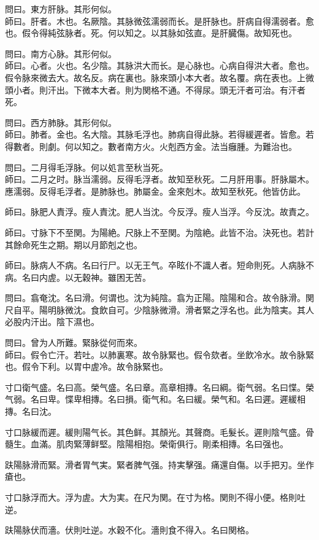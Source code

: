 \documentclass[12pt,twoside,UTF8,b5paper]{ctexbook}
\begin{document}
問曰。東方肝脉。其形何似。\\
師曰。肝者。木也。名厥陰。其脉微弦濡弱而长。是肝脉也。肝病自得濡弱者。愈也。假令得純弦脉者。死。何以知之。以其脉如弦直。是肝臓傷。故知死也。

問曰。南方心脉。其形何似。\\
師曰。心者。火也。名少陰。其脉洪大而长。是心脉也。心病自得洪大者。愈也。假令脉來微去大。故名反。病在裏也。脉來頭小本大者。故名覆。病在表也。上微頭小者。則汗出。下微本大者。則为関格不通。不得尿。頭无汗者可治。有汗者死。

問曰。西方肺脉。其形何似。\\
師曰。肺者。金也。名大陰。其脉毛浮也。肺病自得此脉。若得緩遲者。皆愈。若得數者。則劇。何以知之。數者南方火。火剋西方金。法当癰腫。为難治也。

問曰。二月得毛浮脉。何以処言至秋当死。\\
師曰。二月之时。脉当濡弱。反得毛浮者。故知至秋死。二月肝用事。肝脉屬木。應濡弱。反得毛浮者。是肺脉也。肺屬金。金來剋木。故知至秋死。他皆仿此。

師曰。脉肥人責浮。瘦人責沈。肥人当沈。今反浮。瘦人当浮。今反沈。故責之。

師曰。寸脉下不至関。为陽絶。尺脉上不至関。为陰絶。此皆不治。決死也。若計其餘命死生之期。期以月節剋之也。

師曰。脉病人不病。名曰行尸。以无王气。卒眩仆不識人者。短命則死。人病脉不病。名曰内虗。以无穀神。雖困无苦。

問曰。翕奄沈。名曰滑。何谓也。沈为純陰。翕为正陽。陰陽和合。故令脉滑。関尺自平。陽明脉微沈。食飲自可。少陰脉微滑。滑者緊之浮名也。此为陰実。其人必股内汗出。陰下濕也。

問曰。曾为人所難。緊脉從何而來。\\
師曰。假令亡汗。若吐。以肺裏寒。故令脉緊也。假令欬者。坐飲冷水。故令脉緊也。假令下利。以胃中虗冷。故令脉緊也。

寸口衛气盛。名曰高。榮气盛。名曰章。高章相摶。名曰綱。衛气弱。名曰惵。榮气弱。名曰卑。惵卑相摶。名曰損。衛气和。名曰緩。榮气和。名曰遲。遲緩相摶。名曰沈。

寸口脉緩而遲。緩則陽气长。其色鲜。其顏光。其聲商。毛髮长。遲則陰气盛。骨髓生。血滿。肌肉緊薄鲜堅。陰陽相抱。榮衛俱行。剛柔相摶。名曰强也。

趺陽脉滑而緊。滑者胃气実。緊者脾气强。持実擊强。痛還自傷。以手把刃。坐作瘡也。

寸口脉浮而大。浮为虗。大为実。在尺为関。在寸为格。関則不得小便。格則吐逆。

趺陽脉伏而濇。伏則吐逆。水穀不化。濇則食不得入。名曰関格。
\end{document}
